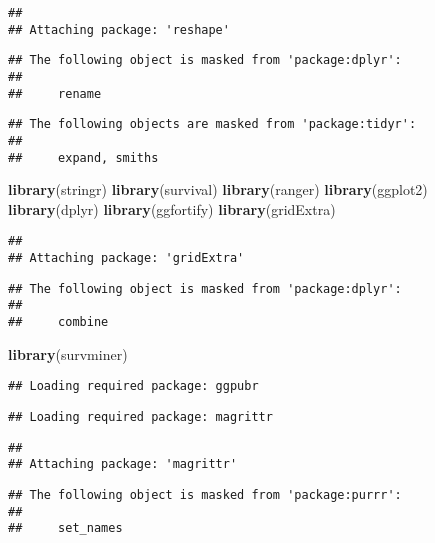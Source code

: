 \documentclass[]{article}
\newenvironment{Shaded}{\begin{snugshade}}{\end{snugshade}}
\newcommand{\KeywordTok}[1]{\textcolor[rgb]{0.13,0.29,0.53}{\textbf{#1}}}
\newcommand{\NormalTok}[1]{#1}
\begin{document}
\begin{verbatim}
## 
## Attaching package: 'reshape'
\end{verbatim}

\begin{verbatim}
## The following object is masked from 'package:dplyr':
## 
##     rename
\end{verbatim}

\begin{verbatim}
## The following objects are masked from 'package:tidyr':
## 
##     expand, smiths
\end{verbatim}

\begin{Shaded}
\begin{Highlighting}[]
\KeywordTok{library}\NormalTok{(stringr)}
\KeywordTok{library}\NormalTok{(survival)}
\KeywordTok{library}\NormalTok{(ranger)}
\KeywordTok{library}\NormalTok{(ggplot2)}
\KeywordTok{library}\NormalTok{(dplyr)}
\KeywordTok{library}\NormalTok{(ggfortify)}
\KeywordTok{library}\NormalTok{(gridExtra)}
\end{Highlighting}
\end{Shaded}

\begin{verbatim}
## 
## Attaching package: 'gridExtra'
\end{verbatim}

\begin{verbatim}
## The following object is masked from 'package:dplyr':
## 
##     combine
\end{verbatim}

\begin{Shaded}
\begin{Highlighting}[]
\KeywordTok{library}\NormalTok{(survminer)}
\end{Highlighting}
\end{Shaded}

\begin{verbatim}
## Loading required package: ggpubr
\end{verbatim}

\begin{verbatim}
## Loading required package: magrittr
\end{verbatim}

\begin{verbatim}
## 
## Attaching package: 'magrittr'
\end{verbatim}

\begin{verbatim}
## The following object is masked from 'package:purrr':
## 
##     set_names
\end{verbatim}
\end{document}
